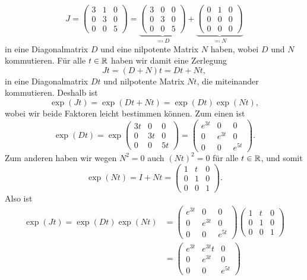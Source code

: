 \documentclass[a4paper, 10pt]{article}
\begin{document}
\[
  J
  =
  \begin{pmatrix}
    3 & 1 & 0 \\
    0 & 3 & 0 \\
    0 & 0 & 5
  \end{pmatrix}
  =
  \underbrace{
  \begin{pmatrix}
    3 & 0 & 0 \\
    0 & 3 & 0 \\
    0 & 0 & 5
  \end{pmatrix}
  }_{\eqqcolon D}
  +
  \underbrace{
  \begin{pmatrix}
    0 & 1 & 0 \\
    0 & 0 & 0 \\
    0 & 0 & 0
  \end{pmatrix}
  }_{\eqqcolon N}
\]
in eine Diagonalmatrix $D$ und eine nilpotente Matrix $N$ haben, wobei $D$ und $N$ kommutieren.
Für alle $t \in \mathbb{R}$ haben wir damit eine Zerlegung
\[
  Jt
  = (D + N)t
  = Dt + Nt,
\]
in eine Diagonalmatrix $Dt$ und nilpotente Matrix $Nt$, die miteinander kommutieren.
Deshalb ist
\[
    \exp(Jt)
  = \exp(Dt + Nt)
  = \exp(Dt) \exp(Nt),
\]
wobei wir beide Faktoren leicht bestimmen können.
Zum einen ist
\[
  \exp(Dt)
  =
  \exp
  \begin{pmatrix}
    3t  & 0   & 0 \\
    0   & 3t  & 0 \\
    0   & 0   & 5t
  \end{pmatrix}
  =
  \begin{pmatrix}
    e^{3t}  & 0       & 0       \\
    0       & e^{3t}  & 0       \\
    0       & 0       & e^{5t}
  \end{pmatrix}.
\]
Zum anderen haben wir wegen $N^2 = 0$ auch $(Nt)^2 = 0$ für alle $t \in \mathbb{R}$, und somit
\[
  \exp(Nt)
  =
  I + Nt
  =
  \begin{pmatrix}
    1 & t & 0 \\
    0 & 1 & 0 \\
    0 & 0 & 1
  \end{pmatrix}.
\]
Also ist
\begin{align*}
      \exp(Jt)
   =  \exp(Dt) \exp(Nt)
  &=
  \begin{pmatrix}
    e^{3t}  & 0       & 0       \\
    0       & e^{3t}  & 0       \\
    0       & 0       & e^{5t}
  \end{pmatrix}
  \begin{pmatrix}
    1 & t & 0 \\
    0 & 1 & 0 \\
    0 & 0 & 1
  \end{pmatrix} \\
  &=
  \begin{pmatrix}
    e^{3t}  & e^{3t} t  & 0       \\
    0       & e^{3t}    & 0       \\
    0       & 0         & e^{5t}
  \end{pmatrix}
\end{align*}
\end{document}
